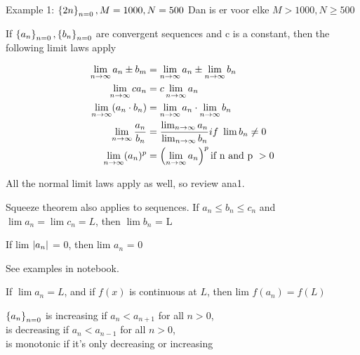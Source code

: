 \documentclass[17pt]{extarticle} %
\begin{document}
Example 1:
$\left\{ 2n \right\}_{n=0}, M=1000, N = 500$
Dan is er voor elke $M > 1000, N \ge 500$



\begin{theorem*}[Th 6]
    If $\left\{ a_n \right\}_{n=0}, \left\{ b_n \right\}_{n=0}$  are convergent sequences and c is a constant, then the following limit laws apply
\end{theorem*}

$$
    \begin{aligned}
        \lim_{n \to \infty} a_n \pm b_m       & =  \lim_{n \to \infty} a_n \pm \lim_{n \to \infty} b_n                          \\
        \lim_{n \to \infty} c a_n             & = c \lim_{n \to \infty} a_n                                                     \\
        \lim_{n \to \infty}  ( a_n \cdot b_n) & = \lim_{n \to \infty}  a_n \cdot \lim_{n \to \infty}  b_n                       \\
        \lim_{n \to \infty}  \frac{a_n}{b_n}  & = {\lim_{n \to \infty}  a_n \over \lim_{n \to \infty } b_n} if\ \lim b_n \neq 0 \\
        \lim_{n \to \infty}  (a_n)^p          & = \left( \lim_{n \to \infty}  a_n \right)^p \text{if n and p } > 0
    \end{aligned}
$$

All the normal limit laws apply as well, so review ana1.

\begin{theorem*}[Squeeze th.]
    Squeeze theorem also applies to sequences. If $a_n \leq b_n \leq c_n$ and $\lim a_n = \lim c_n = L$,
    then $\lim b_n$ = L
\end{theorem*}

\begin{theorem*}[Th 6]
    If lim $\left|a_n\right|$ = 0, then lim $a_n$ = 0
\end{theorem*}

See examples in notebook.

\begin{theorem*}[Th 7]
    If $\lim a_n = L$, and if $f(x)$ is continuous at $L$, then lim $f(a_n) = f(L)$

\end{theorem*}

\begin{theorem*}
    $\left\{ a_n \right\}_{n=0}$ is increasing if $a_n < a_{n+1}$ for all $n > 0$,\\
    is decreasing if $a_n < a_{n-1}$ for all $n > 0$,\\
    is monotonic if it's only decreasing or increasing

\end{theorem*}
\end{document}
